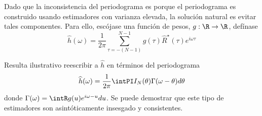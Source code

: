 Dado que la inconsistencia del periodograma es porque el periodograma es construido usando 
estimadores con varianza elevada, la solución natural es evitar tales componentes. Para ello, 
escójase una función de pesos, $g: \R \rightarrow \R$, defínase
%
\begin{equation}
\widehat{h}(\omega) = \frac{1}{2 \pi} \sum_{\tau = -(N-1)}^{N-1} g(\tau) \widehat{R}^{\star}(\tau) 
e^{i \omega \tau} 
\label{txt_estimador}
\end{equation}

Resulta ilustrativo reescribir a $\widehat{h}$ en términos del periodograma
\begin{equation*}
\widehat{h}(\omega) = \frac{1}{2 \pi} \intPI I_N(\theta) \Gamma(\omega - \theta) d\theta
\end{equation*}
donde $\Gamma(\omega) = \intR g(u) e^{i \omega -u } du$.
%
Se puede demostrar que este tipo de estimadores son asintóticamente insesgado y consistentes.

